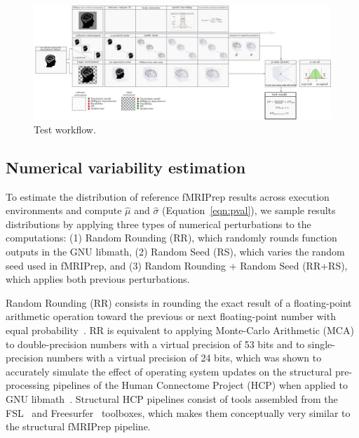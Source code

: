 \documentclass{article}
\begin{document}
\begin{figure}
    \centering
    \includegraphics[width=\linewidth]{figures/stat_test_procedure.pdf}
    \caption{Test workflow.}
    \label{fig:test_workflow}
\end{figure}

\subsection{Numerical variability estimation}

To estimate the distribution of reference fMRIPrep results across execution environments and compute $\hat \mu$ and $\hat \sigma$ (Equation~\ref{eqn:pval}), we sample results distributions by applying three types of numerical perturbations to the computations: (1) Random Rounding (RR), which randomly rounds function outputs in the GNU libmath, (2) Random Seed (RS), which varies the random seed used in fMRIPrep, and (3) Random Rounding + Random Seed (RR+RS), which applies both previous perturbations.

Random Rounding (RR) consists in rounding the exact result of a floating-point arithmetic operation toward the previous or next floating-point number with equal probability~\cite{forsythe1959reprint}. RR is equivalent to applying Monte-Carlo Arithmetic (MCA) to double-precision numbers with a virtual precision of 53 bits and to single-precision numbers with a virtual precision of 24 bits, which was shown to accurately simulate the effect of operating system updates on the structural pre-processing pipelines of the Human Connectome Project (HCP) when applied to GNU libmath~\cite{salari2021accurate}. Structural HCP pipelines consist of tools assembled from the FSL~\cite{jenkinson2012fsl} and Freesurfer~\cite{fischl2012freesurfer} toolboxes, which makes them conceptually very similar to the structural fMRIPrep pipeline.
\end{document}
